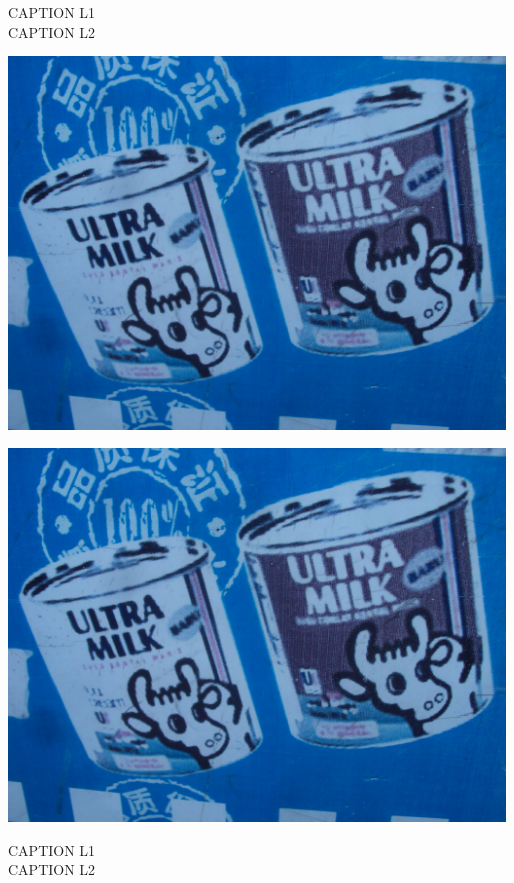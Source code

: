 \documentclass[10pt,letterpaper]{article}
\begin{document}
CAPTION L1\\
CAPTION L2\\
\pagebreak

\includegraphics[width=5.19in]{landscape.jpg}

\vspace{0.25in}
\includegraphics[width=5.19in]{landscape.jpg}

CAPTION L1\\
CAPTION L2\\
\pagebreak
\end{document}
